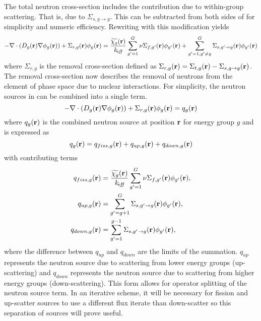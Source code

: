   The total neutron cross-section includes the contribution due to 
  within-group scattering. That is, due to $\Sigma_{s,g\rightarrow g}$. This can
  be subtracted from both sides of  for simplicity 
  and numeric efficiency. Rewriting  with this
  modification yields
  \begin{equation} 
    \label{eq:multigroup_removal}
    - \mathbf{\nabla} \cdot( D_g(\mathbf{r}) \mathbf{\nabla} \phi_g(\mathbf{r})) + \Sigma_{r,g}(\mathbf{r}) \phi_g(\mathbf{r}) = 
      \frac{\widetilde{\chi_g}(\mathbf{r})}{k_{\!\mbox{\scriptsize \em eff}}} 
      \sum_{g'=1}^{G} \nu\Sigma_{f,g'}(\mathbf{r}) 
      \phi_{g'}(\mathbf{r}) + \sum_{g'=1, g' \ne g}^{G} 
      \Sigma_{s,g' \rightarrow g}(\mathbf{r}) \phi_{g'}(\mathbf{r})
  \end{equation}
  where $\Sigma_{r,g}$ is the removal cross-section defined as 
  $\Sigma_{r,g}(\mathbf{r}) = \Sigma_{t,g}(\mathbf{r}) - \Sigma_{s,g\rightarrow g}(\mathbf{r})$. The
  removal cross-section now describes the removal of neutrons from the element
  of phase space due to nuclear interactions. 
  For simplicity, the neutron sources in  can be 
  combined into a single term.
  \begin{equation}
    \label{eq:multigroup_source}
    - \mathbf{\nabla} \cdot( D_g(\mathbf{r}) \mathbf{\nabla} \phi_g(\mathbf{r})) + \Sigma_{r,g}(\mathbf{r}) \phi_g(\mathbf{r}) = 
      q_g(\mathbf{r})
  \end{equation}
  where $q_g(\mathbf{r})$ is the combined neutron source at position $\mathbf{r}$ for energy
  group $g$ and is expressed as
  \begin{equation}
    \label{eq:q}
    q_g(\mathbf{r}) = q_{fiss,g}(\mathbf{r}) + q_{up,g}(\mathbf{r}) + q_{down,g}(\mathbf{r}) 
  \end{equation}
  with contributing terms
  \begin{align}
    \label{eq:qfiss}
    q_{fiss,g}(\mathbf{r}) &= \frac{\widetilde{\chi_g}(\mathbf{r})}{k_{\!\mbox{\scriptsize \em eff}}} \sum_{g'=1}^{G} 
      \nu \Sigma_{f,g'}(\mathbf{r}) \phi_{g'}(\mathbf{r}), \\
    \label{eq:qup}
    q_{up,g}(\mathbf{r}) &= \sum_{g'=g+1}^{G} \Sigma_{s,g' \rightarrow g}(\mathbf{r})
      \phi_{g'}(\mathbf{r}), \\
    \label{eq:qdown}
    q_{down,g}(\mathbf{r}) &= \sum_{g'=1}^{g-1} \Sigma_{s,g' \rightarrow g}(\mathbf{r})
      \phi_{g'}(\mathbf{r}),
  \end{align}
  where the difference between $q_{up}$ and $q_{down}$ are the limits of the 
  summation. $q_{up}$ represents the neutron source due to scattering from lower
  energy groups (up-scattering) and $q_{down}$ represents the neutron source due
  to scattering from higher energy groups (down-scattering). This form allows
  for operator splitting of the neutron source term.
  In an iterative scheme, it will be necessary for fission and up-scatter 
  sources to use a different flux iterate than down-scatter so this separation
  of sources will prove useful.

